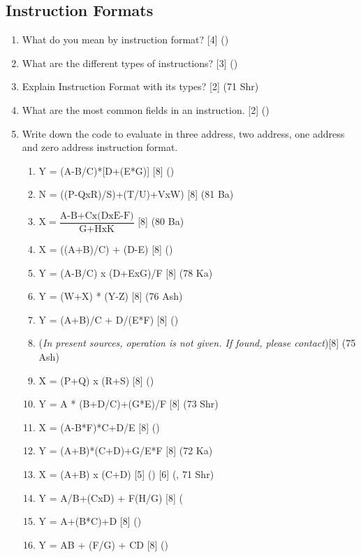 \documentclass[12pt]{article}
\begin{document}
\subsection{Instruction Formats}
\begin{enumerate}[noitemsep, topsep = 0pt]
	\item What do you mean by instruction format? \hfill [4] ()
	
	\item What are the different types of instructions? \hfill [3] ()
	
	\item Explain Instruction Format with its types? \hfill [2] (71 Shr)
	
	\item What are the most common fields in an instruction. \hfill [2] ()
	
	\item Write down the code to evaluate in three address, two address, one address and zero address instruction format.
	\begin{enumerate}[noitemsep, topsep = 0pt, label = \alph*.]
		\item Y = (A-B/C)*[D+(E*G)] \hfill [8] ()
		\item N = ((P-QxR)/S)+(T/U)+VxW) \hfill [8] (81 Ba)
		\item $\text{X} = \dfrac{\text{A-B+Cx(DxE-F})}{\text{G+HxK}}$ \hfill [8] (80 Ba)
		\item X = ((A+B)/C) + (D-E) \hfill [8] ()
		\item Y = (A-B/C) x (D+ExG)/F \hfill [8] (78 Ka)
		\item Y = (W+X) * (Y-Z) \hfill [8] (76 Ash)
		\item Y = (A+B)/C + D/(E*F) \hfill [8] ()
		\item (\textit{In present sources, operation is not given. If found, please contact})\hfill [8] (75 Ash)
		\item X = (P+Q) x (R+S) \hfill [8] ()
		\item Y = A * (B+D/C)+(G*E)/F \hfill [8] (73 Shr)
		\item X = (A-B*F)*C+D/E \hfill [8] ()
		\item Y = (A+B)*(C+D)+G/E*F \hfill [8] (72 Ka)
		\item X = (A+B) x (C+D) \hfill [5] () [6] (, 71 Shr)
		\item Y = A/B+(CxD) + F(H/G) \hfill [8] (
		\item Y = A+(B*C)+D \hfill [8] ()
		\item Y = AB + (F/G) + CD [8] ()
		
	\end{enumerate}
\end{enumerate}
\end{document}
